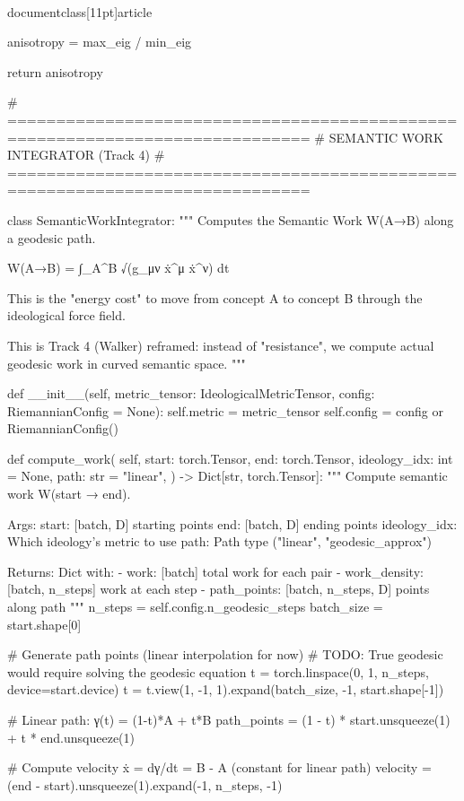 \\documentclass[11pt]{article}
\begin{document}
\begin{CodeBlock}
        anisotropy = max_eig / min_eig

        return anisotropy


# =============================================================================
# SEMANTIC WORK INTEGRATOR (Track 4)
# =============================================================================

class SemanticWorkIntegrator:
    """
    Computes the Semantic Work W(A→B) along a geodesic path.

    W(A→B) = ∫_A^B √(g_μν ẋ^μ ẋ^ν) dt

    This is the "energy cost" to move from concept A to concept B
    through the ideological force field.

    This is Track 4 (Walker) reframed: instead of "resistance",
    we compute actual geodesic work in curved semantic space.
    """

    def __init__(self, metric_tensor: IdeologicalMetricTensor, config: RiemannianConfig = None):
        self.metric = metric_tensor
        self.config = config or RiemannianConfig()

    def compute_work(
        self,
        start: torch.Tensor,
        end: torch.Tensor,
        ideology_idx: int = None,
        path: str = "linear",
    ) -> Dict[str, torch.Tensor]:
        """
        Compute semantic work W(start → end).

        Args:
            start: [batch, D] starting points
            end: [batch, D] ending points
            ideology_idx: Which ideology's metric to use
            path: Path type ("linear", "geodesic_approx")

        Returns:
            Dict with:
            - work: [batch] total work for each pair
            - work_density: [batch, n_steps] work at each step
            - path_points: [batch, n_steps, D] points along path
        """
        n_steps = self.config.n_geodesic_steps
        batch_size = start.shape[0]

        # Generate path points (linear interpolation for now)
        # TODO: True geodesic would require solving the geodesic equation
        t = torch.linspace(0, 1, n_steps, device=start.device)
        t = t.view(1, -1, 1).expand(batch_size, -1, start.shape[-1])

        # Linear path: γ(t) = (1-t)*A + t*B
        path_points = (1 - t) * start.unsqueeze(1) + t * end.unsqueeze(1)

        # Compute velocity ẋ = dγ/dt = B - A (constant for linear path)
        velocity = (end - start).unsqueeze(1).expand(-1, n_steps, -1)


\end{CodeBlock}
\end{document}

